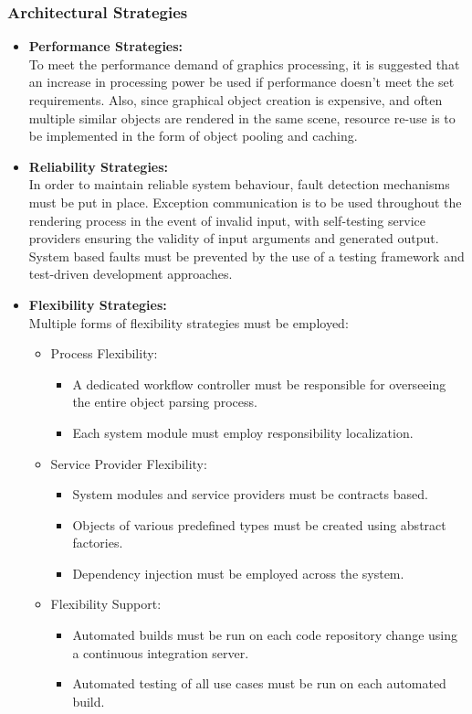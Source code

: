\documentclass[a4paper,12pt]{article}
\begin{document}
	\subsubsection{Architectural Strategies}
		
		\begin{itemize}
			\item \textbf{Performance Strategies:}\\
				To meet the performance demand of graphics processing, it is suggested that an increase in processing power be used if performance doesn't meet the set requirements. Also, since graphical object creation is expensive, and often multiple similar objects are rendered in the same scene, resource re-use is to be implemented in the form of object pooling and caching.
			\item \textbf{Reliability Strategies:}\\
				In order to maintain reliable system behaviour, fault detection mechanisms must be put in place. Exception communication is to be used throughout the rendering process in the event of invalid input, with self-testing service providers ensuring the validity of input arguments and generated output. System based faults must be prevented by the use of a testing framework and test-driven development approaches.
			\item \textbf{Flexibility Strategies:}\\
				Multiple forms of flexibility strategies must be employed:
				
				\begin{itemize}
					\item Process Flexibility:
						\begin{itemize}
							\item A dedicated workflow controller must be responsible for overseeing the entire object parsing process.
							\item Each system module must employ responsibility localization.
						\end{itemize}
					\item Service Provider Flexibility:
						\begin{itemize}
							\item System modules and service providers must be contracts based.
							\item Objects of various predefined types must be created using abstract factories.
							\item Dependency injection must be employed across the system.
						\end{itemize}
					\item Flexibility Support:
						\begin{itemize}
							\item Automated builds must be run on each code repository change using a continuous integration server.
							\item Automated testing of all use cases must be run on each automated build.
						\end{itemize}
				\end{itemize}
		\end{itemize}

\newpage
%
%
\end{document}
